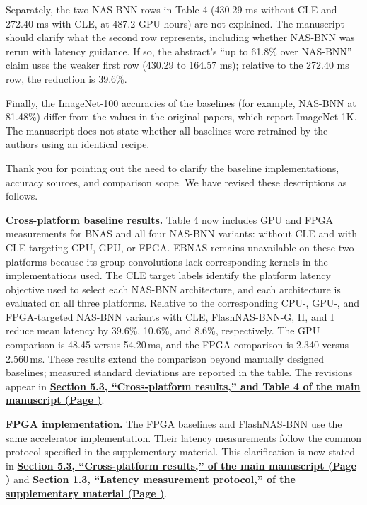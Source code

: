 \documentclass[11pt]{article}
\newcommand{\response}[1]{%
  \Needspace{3\baselineskip}%
  \par\noindent{\color{responseblue}\textbf{Response to #1:}}\par
  \vspace{1mm}\color{responseblue}}
\newcommand{\revloc}[1]{%
  \textcolor{revisionred}{\textbf{\uline{#1}}}}
\begin{document}
\begin{enumerate}[leftmargin=0pt,label={},itemsep=5mm]
Separately, the two NAS-BNN rows in Table 4 (430.29 ms without CLE and 272.40 ms with CLE, at 487.2 GPU-hours) are not explained. The manuscript should clarify what the second row represents, including whether NAS-BNN was rerun with latency guidance. If so, the abstract's ``up to 61.8\% over NAS-BNN'' claim uses the weaker first row (430.29 to 164.57 ms); relative to the 272.40 ms row, the reduction is 39.6\%.

Finally, the ImageNet-100 accuracies of the baselines (for example, NAS-BNN at 81.48\%) differ from the values in the original papers, which report ImageNet-1K. The manuscript does not state whether all baselines were retrained by the authors using an identical recipe.
\response{Major Comment 3}
\begingroup
\normalfont\color{responseblue}
Thank you for pointing out the need to clarify the baseline implementations, accuracy sources, and comparison scope. We have revised these descriptions as follows.

\textbf{Cross-platform baseline results.} Table 4 now includes GPU and FPGA measurements for BNAS and all four NAS-BNN variants: without CLE and with CLE targeting CPU, GPU, or FPGA. EBNAS remains unavailable on these two platforms because its group convolutions lack corresponding kernels in the implementations used. The CLE target labels identify the platform latency objective used to select each NAS-BNN architecture, and each architecture is evaluated on all three platforms. Relative to the corresponding CPU-, GPU-, and FPGA-targeted NAS-BNN variants with CLE, FlashNAS-BNN-G, H, and I reduce mean latency by 39.6\%, 10.6\%, and 8.6\%, respectively. The GPU comparison is 48.45 versus 54.20\,ms, and the FPGA comparison is 2.340 versus 2.560\,ms. These results extend the comparison beyond manually designed baselines; measured standard deviations are reported in the table. The revisions appear in \revloc{Section 5.3, ``Cross-platform results,'' and Table 4 of the main manuscript (Page \underline{\hspace{1cm}})}.


\textbf{FPGA implementation.} The FPGA baselines and FlashNAS-BNN use the same accelerator implementation. Their latency measurements follow the common protocol specified in the supplementary material. This clarification is now stated in \revloc{Section 5.3, ``Cross-platform results,'' of the main manuscript (Page \underline{\hspace{1cm}})} and \revloc{Section 1.3, ``Latency measurement protocol,'' of the supplementary material (Page \underline{\hspace{1cm}})}.


\end{enumerate}
\end{document}
